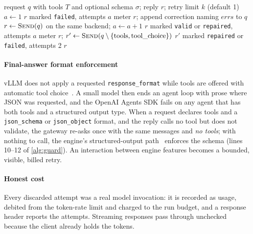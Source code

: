 \documentclass[conference,letterpaper]{IEEEtran}
\newcommand{\code}[1]{\texttt{\small #1}}
\begin{document}
\begin{algorithm}[t]
\caption{Tool-call guard and final-answer format enforcement}
\label{alg:guard}
\small
\begin{algorithmic}[1]
\Require request $q$ with tools $T$ and optional schema $\sigma$; reply $r$; retry limit $k$ (default 1)
  \State $a \gets 1$
     \State \Return $r$ marked \code{failed}, attempts $a$ \EndIf
    \State meter $r$; append correction naming $\mathit{errs}$ to $q$
    \State $r \gets \textsc{Send}(q)$ on the same backend; $a \gets a+1$
  \EndWhile
  \State \Return $r$ marked \code{valid} or \code{repaired}, attempts $a$
  \State meter $r$; $r' \gets \textsc{Send}(q \setminus \{\text{tools}, \text{tool\_choice}\})$
  \State \Return $r'$ marked \code{repaired} or \code{failed}, attempts 2
\EndIf
\State \Return $r$
\end{algorithmic}
\end{algorithm}

\paragraph*{Final-answer format enforcement}
vLLM does not apply a requested \code{response\_format} while tools are offered with automatic
tool choice~\cite{vllmdocs}. A small model then ends an agent loop with prose where JSON was
requested, and the OpenAI Agents SDK fails on any agent that has both tools and a structured
output type. When a request declares tools and a \code{json\_schema} or \code{json\_object}
format, and the reply calls no tool but does not validate, the gateway re-asks once with the
same messages and \emph{no tools}; with nothing to call, the engine's structured-output
path~\cite{outlines} enforces the schema (lines 10--12 of \cref{alg:guard}). An interaction
between engine features becomes a bounded, visible, billed retry.

\paragraph*{Honest cost}
Every discarded attempt was a real model invocation: it is recorded as usage, debited from the
token-rate limit and charged to the run budget, and a response header reports the attempts.
Streaming responses pass through unchecked because the client already holds the tokens.
\end{document}

